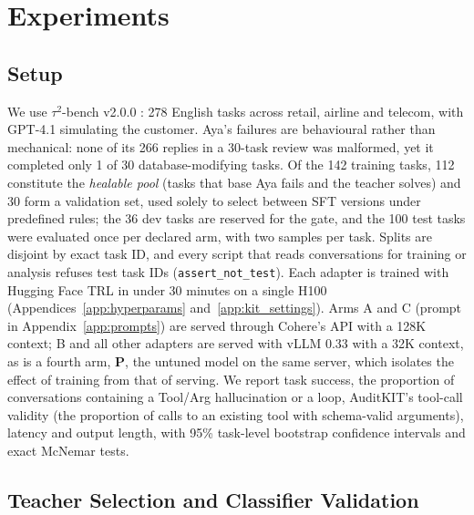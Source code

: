 \documentclass[11pt]{article}
\begin{document}
\section{Experiments}
\label{sec:experiments}

\subsection{Setup}
\label{sec:exp_setup}

We use $\tau^2$-bench v2.0.0 \citep{Barres2025Tau2Bench}: 278 English tasks across retail, airline and telecom, with GPT-4.1 simulating the customer. Aya's failures are behavioural rather than mechanical: none of its 266 replies in a 30-task review was malformed, yet it completed only 1 of 30 database-modifying tasks. Of the 142 training tasks, 112 constitute the \emph{healable pool} (tasks that base Aya fails and the teacher solves) and 30 form a validation set, used solely to select between SFT versions under predefined rules; the 36 dev tasks are reserved for the gate, and the 100 test tasks were evaluated once per declared arm, with two samples per task. Splits are disjoint by exact task ID, and every script that reads conversations for training or analysis refuses test task IDs (\texttt{assert\_not\_test}). Each adapter is trained with Hugging Face TRL in under 30 minutes on a single H100 (Appendices~\ref{app:hyperparams} and~\ref{app:kit_settings}). Arms A and C (prompt in Appendix~\ref{app:prompts}) are served through Cohere's API with a 128K context; B and all other adapters are served with vLLM 0.33 \citep{Kwon2023EfficientMemory} with a 32K context, as is a fourth arm, \textbf{P}, the untuned model on the same server, which isolates the effect of training from that of serving. We report task success, the proportion of conversations containing a Tool/Arg hallucination or a loop, AuditKIT's tool-call validity (the proportion of calls to an existing tool with schema-valid arguments), latency and output length, with 95\% task-level bootstrap confidence intervals and exact McNemar tests.

\subsection{Teacher Selection and Classifier Validation}
\label{sec:exp_teacher}
\end{document}
